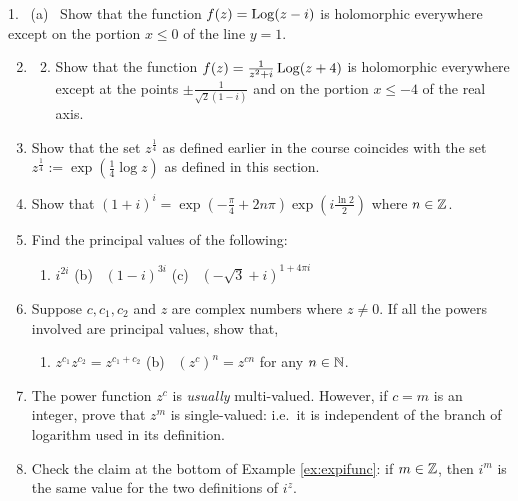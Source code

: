 \begin{exercises*}
\hangindent\doubleind
\textup{1.} \ (a) \ Show that the function $f(z)=\operatorname{Log}(z-i)$ is holomorphic everywhere except on the portion $x\le 0$ of the line $y=1$.
\begin{enumerate}\setcounter{enumi}{1}
  \item[]\begin{enumerate}\setcounter{enumii}{1}
    \item Show that the function $f(z)=\frac 1{z^2+i}\operatorname{Log}(z+4)$ is holomorphic everywhere except at the points $\pm\frac 1{\sqrt 2(1-i)}$ and on the portion $x\le -4$ of the real axis.
  \end{enumerate}
  
  \item Show that the set $z^{\frac 14}$ as defined earlier in the course coincides with the set $z^{\frac 14}:=\exp\left(\frac 14\log z\right)$ as defined in this section.
  
  \item Show that $(1+i)^i=\exp\left(-\frac \pi 4+2n\pi\right)\exp\left(i\frac{\ln 2}2\right)$ where $n\in\mathbb{Z}$.
  
  \item Find the principal values of the following:
  \begin{enumerate}
  	\item $i^{2i}$\qquad
  	(b) \ $(1-i)^{3i}$\qquad
  	(c) \ $(-\sqrt 3+i)^{1+4\pi i}$
  \end{enumerate}
  
 
  
  \item Suppose $c,c_1,c_2$ and $z$ are complex numbers where $z\neq 0$. If all the powers involved are principal values, show that,
  \begin{enumerate}
  	\item $z^{c_1}z^{c_2}=z^{c_1+c_2}$\qquad
  	(b) \ $(z^c)^n=z^{cn}$ for any $n\in\mathbb{N}$.
  \end{enumerate}
  
  \item The power function $z^c$ is \emph{usually} multi-valued. However, if $c=m$ is an integer, prove that $z^m$ is single-valued: i.e.\ it is independent of the branch of logarithm used in its definition.
  
  \item Check the claim at the bottom of Example \ref{ex:expifunc}: if $m\in\mathbb{Z}$, then $i^m$ is the same value for the two definitions of $i^z$.
  

\end{enumerate}
\end{exercises*}
